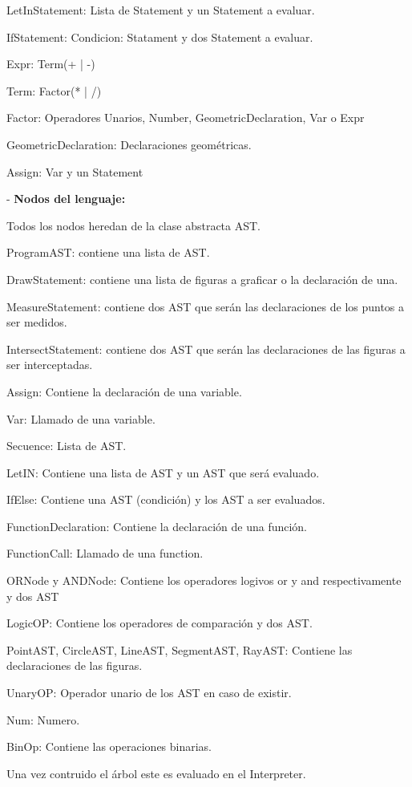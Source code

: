 \documentclass[a4paper,12pt]{article}
\begin{document}
	LetInStatement: Lista de Statement y un Statement a evaluar.
	
	IfStatement: Condicion: Statament y dos Statement a evaluar.
	
	Expr: Term(+ | -)
	
	Term: Factor(* | /)
	
	Factor: Operadores Unarios, Number, GeometricDeclaration, Var o Expr
	
	GeometricDeclaration: Declaraciones geométricas.
	
	Assign: Var y un Statement
	\vspace{0.5cm}
	
	- \textbf{Nodos del lenguaje:}
	
	Todos los nodos heredan de la clase abstracta AST.
	
	ProgramAST: contiene una lista de AST.
	
	DrawStatement: contiene una lista de figuras a graficar o la declaración de una.
	
	MeasureStatement: contiene dos AST que serán las declaraciones de los puntos a ser medidos.
	
	IntersectStatement: contiene dos AST que serán las declaraciones de las figuras a ser interceptadas.
	
	Assign: Contiene la declaración de una variable.
	
	Var: Llamado de una variable.
	
	Secuence: Lista de AST.
	
	LetIN: Contiene una lista de AST y un AST que será evaluado.
	
	IfElse: Contiene una AST (condición) y los AST a ser evaluados.
	
	FunctionDeclaration: Contiene la declaración de una función.
	
	FunctionCall: Llamado de una function.
	
	ORNode y ANDNode: Contiene los operadores logivos or y and respectivamente y dos AST
	
	LogicOP: Contiene los operadores de comparación y dos AST.
	
	PointAST, CircleAST, LineAST, SegmentAST, RayAST: Contiene las declaraciones de las figuras.
	
	UnaryOP: Operador unario de los AST en caso de existir.
	
	Num: Numero.
	
	BinOp: Contiene las operaciones binarias.
	
	Una vez contruido el árbol este es evaluado en el Interpreter.
	
\end{document}
